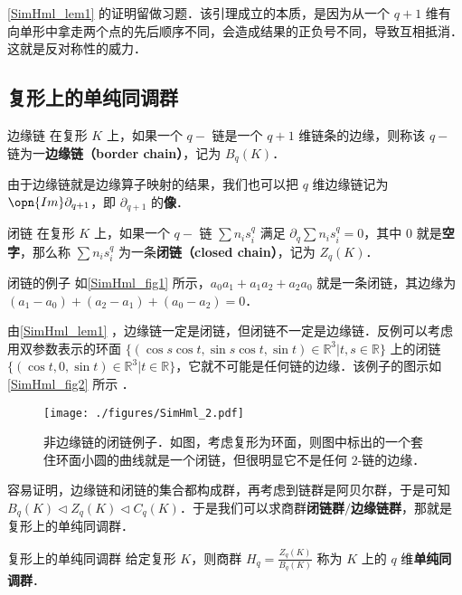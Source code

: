 \autoref{SimHml_lem1} 的证明留做习题．该引理成立的本质，是因为从一个 $q+1$ 维有向单形中拿走两个点的先后顺序不同，会造成结果的正负号不同，导致互相抵消．这就是反对称性的威力．


\subsection{复形上的单纯同调群}


\begin{definition}{边缘链}
在复形 $K$ 上，如果一个 $q-$ 链是一个 $q+1$ 维链条的边缘，则称该 $q-$ 链为一\textbf{边缘链（border chain）}，记为 $B_q(K)$．
\end{definition}

由于边缘链就是边缘算子映射的结果，我们也可以把 $q$ 维边缘链记为 $\opn{Im}\partial_{q+1}$，即 $\partial_{q+1}$ 的\textbf{像}．

\begin{definition}{闭链}
在复形 $K$ 上，如果一个 $q-$ 链 $\sum n_is^q_i$ 满足 $\partial_q\sum n_is^q_i=0$，其中 $0$ 就是\textbf{空字}，那么称 $\sum n_is^q_i$ 为一条\textbf{闭链（closed chain）}，记为 $Z_q(K)$．
\end{definition}

\begin{example}{闭链的例子}
如\autoref{SimHml_fig1} 所示，$a_0a_1+a_1a_2+a_2a_0$ 就是一条闭链，其边缘为 $(a_1-a_0)+(a_2-a_1)+(a_0-a_2)=0$．
\end{example}

由\autoref{SimHml_lem1} ，边缘链一定是闭链，但闭链不一定是边缘链．反例可以考虑用双参数表示的环面 $\{(\cos s\cos t, \sin s\cos t, \sin t)\in\mathbb{R}^3|t, s\in\mathbb{R}\}$ 上的闭链 $\{(\cos t, 0, \sin t)\in\mathbb{R}^3|t\in\mathbb{R}\}$，它就不可能是任何链的边缘．该例子的图示如\autoref{SimHml_fig2} 所示 ．


\begin{figure}[ht]
\centering
\texttt{[image: ./figures/SimHml\_2.pdf]}
\caption{非边缘链的闭链例子．如图，考虑复形为环面，则图中标出的一个套住环面小圆的曲线就是一个闭链，但很明显它不是任何 $2$-链的边缘．} \label{SimHml_fig2}
\end{figure}




容易证明，边缘链和闭链的集合都构成群，再考虑到链群是阿贝尔群，于是可知 $B_q(K)\triangleleft Z_q(K)\triangleleft C_q(K)$．于是我们可以求商群\textbf{闭链群}$/$\textbf{边缘链群}，那就是复形上的单纯同调群．


\begin{definition}{复形上的单纯同调群}
给定复形 $K$，则商群 $H_q=\frac{Z_q(K)}{B_q(K)}$ 称为 $K$ 上的 $q$ 维\textbf{单纯同调群}．
\end{definition}